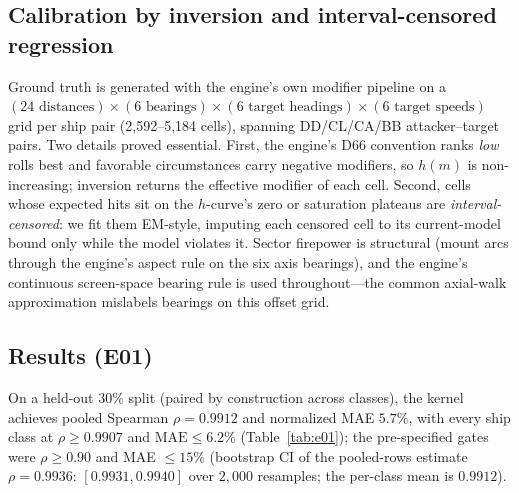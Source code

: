 \documentclass[12pt,a4paper]{article}
\begin{document}
\subsection{Calibration by inversion and interval-censored regression}
Ground truth is generated with the engine's own modifier pipeline on a
$(24\text{ distances})\times(6\text{ bearings})\times(6\text{ target
headings})\times(6\text{ target speeds})$ grid per ship pair
(2{,}592--5{,}184 cells), spanning DD/CL/CA/BB attacker--target pairs.  Two
details proved essential.  First, the engine's D66 convention ranks
\emph{low} rolls best and favorable circumstances carry negative
modifiers, so $h(m)$ is non-increasing; inversion returns the effective
modifier of each cell.  Second, cells whose expected hits sit on the
$h$-curve's zero or saturation plateaus are \emph{interval-censored}: we
fit them EM-style, imputing each censored cell to its current-model bound
only while the model violates it.  Sector firepower is structural (mount
arcs through the engine's aspect rule on the six axis bearings), and the
engine's continuous screen-space bearing rule is used throughout---the
common axial-walk approximation mislabels bearings on this offset grid.

\subsection{Results (E01)}
On a held-out 30\% split (paired by construction across classes), the
kernel achieves pooled Spearman $\rho=0.9912$ and normalized MAE
$5.7\%$, with every ship class at $\rho\ge0.9907$ and
$\text{MAE}\le6.2\%$ (Table~\ref{tab:e01}); the pre-specified gates were
$\rho\ge0.90$ and MAE $\le15\%$ (bootstrap CI of the pooled-rows
estimate $\rho=0.9936$: $[0.9931, 0.9940]$ over $2{,}000$ resamples; the
per-class mean is $0.9912$).
\end{document}
